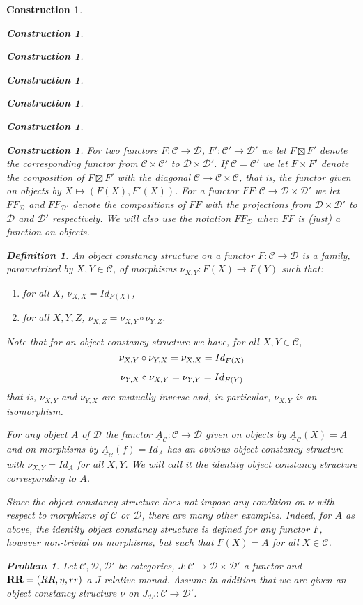 \documentclass[12pt]{amsart}
\newtheorem{definition}[proposition]{Definition}
\newtheorem{problem}[proposition]{Problem}
\newtheorem{construction}[proposition]{Construction}
\newcommand{\llabel}[1]{\label{#1}}
\newcommand{\sr}{\rightarrow}
\newcommand{\uu}{\underline}
\newcommand{\RR}{{\bf RR}}
\newcommand{\C}{{\mathcal C}}
\newcommand{\D}{{\mathcal D}}
\begin{document}
\begin{construction}
\begin{construction}
\begin{construction}
\begin{construction}
\begin{construction}
\begin{construction}
\begin{construction}
For two functors $F:\C\sr\D$, $F':\C'\sr\D'$ we let $F\boxtimes F'$ denote the
corresponding functor from $\C\times\C'$ to $\D\times\D'$. If $\C=\C'$ we let
$F\times F'$ denote the composition of $F\boxtimes F'$ with the diagonal $\C\sr
\C\times\C$, that is, the functor given on objects by $X\mapsto
(F(X),F'(X))$. For a functor $FF:\C\sr \D\times\D'$ we let $FF_{\D}$ and
$FF_{\D'}$ denote the compositions of $FF$ with the projections from
$\D\times\D'$ to $\D$ and $\D'$ respectively. We will also use the notation
$FF_{\D}$ when $FF$ is (just) a function on objects.
%
\begin{definition}
  \llabel{2017.04.21.def1}
  An object constancy structure on a functor $F:\C\sr\D$
  is a family, parametrized by $X,Y\in\C$, of morphisms $\nu_{X,Y}:F(X)\sr F(Y)$
  such that:
%
\begin{enumerate}
\item \llabel{2017.04.21.eq3} for all $X$, $\nu_{X,X}=Id_{F(X)}$,
\item \llabel{2017.04.21.eq4} for all $X,Y,Z$, $\nu_{X,Z}=\nu_{X,Y}\circ\nu_{Y,Z}$.
\end{enumerate}
\end{definition}
%
Note that for an object constancy structure we have, for all $X,Y\in \C$, 
%
$$
\begin{CD}
\nu_{X,Y}\circ \nu_{Y,X}=\nu_{X,X}=Id_{F(X)}\\
\nu_{Y,X}\circ \nu_{X,Y}=\nu_{Y,Y}=Id_{F(Y)}
\end{CD}
$$
%
that is, $\nu_{X,Y}$ and $\nu_{Y,X}$ are mutually inverse and, in particular, $\nu_{X,Y}$ is an isomorphism. 

For any object $A$ of $\D$ the functor $\uu{A}_{\C}:\C\sr \D$ given on objects
by $\uu{A}_{\C}(X)=A$ and on morphisms by $\uu{A}_{\C}(f)=Id_A$ has an obvious
object constancy structure with $\nu_{X,Y}=Id_A$ for all $X,Y$. We will call it
the identity object constancy structure corresponding to $A$.

Since the object constancy structure does not impose any condition on $\nu$
with respect to morphisms of $\C$ or $\D$, there are many other
examples. Indeed, for $A$ as above, the identity object constancy structure is
defined for any functor $F$, however non-trivial on morphisms, but such that
$F(X)=A$ for all $X\in\C$.
%
\begin{problem}
\llabel{2017.04.21.prob1}
Let $\C,\D,\D'$ be categories, $J:\C\sr \D\times\D'$ a functor and
$\RR=(RR,\eta,rr)$ a $J$-relative monad. Assume in addition that we are given
an object constancy structure $\nu$ on $J_{\D'}:\C\sr\D'$.


\end{problem}
\end{construction}
\end{construction}
\end{construction}
\end{construction}
\end{construction}
\end{construction}
\end{construction}
\end{document}
